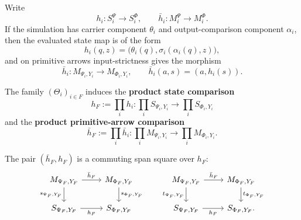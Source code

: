 Write
\[
    h_i:S_i^\Psi\to S_i^\Phi,
    \qquad
    \bar h_i:M_i^\Psi\to M_i^\Phi.
\]
If the simulation has carrier component \(\theta_i\) and output-comparison
component \(\alpha_i\), then the evaluated state map is of the form
\[
    h_i(q,z)=\bigl(\theta_i(q),\sigma_i(\alpha_i(q),z)\bigr),
\]
and on primitive arrows input-strictness gives the morphism
\[
    \bar h_i:
    M_{\Psi_i,Y_i}\to M_{\Phi_i,Y_i},
    \qquad
    \bar h_i(a,s)=(a,h_i(s)).
\]

\begin{definition}
\label{def:cmett-product-evaluated-simulation-comparison}
    The family \((\Theta_i)_{i\in F}\) induces the \textbf{product state
    comparison}
    \[
        h_F:=\prod_i h_i:
        \prod_iS_{\Psi_i,Y_i}
        \to
        \prod_iS_{\Phi_i,Y_i}
    \]
    and the \textbf{product primitive-arrow comparison}
    \[
        \bar h_F:=\prod_i\bar h_i:
        \prod_iM_{\Psi_i,Y_i}
        \to
        \prod_iM_{\Phi_i,Y_i}.
    \]
\end{definition}

\begin{proposition}
\label{prop:cmett-simulation-compatibility-monoidal-execution}
    The pair \((\bar h_F,h_F)\) is a commuting span square over \(h_F\):
    \[
\begin{tikzcd}
M_{\Psi_F,Y_F}
    \arrow[r,"\bar h_F"]
    \arrow[d,"s_{\Psi_F,Y_F}"']
&
M_{\Phi_F,Y_F}
    \arrow[d,"s_{\Phi_F,Y_F}"]
\\
S_{\Psi_F,Y_F}
    \arrow[r,"h_F"']
&
S_{\Phi_F,Y_F}
\end{tikzcd}
    \qquad
\begin{tikzcd}
M_{\Psi_F,Y_F}
    \arrow[r,"\bar h_F"]
    \arrow[d,"t_{\Psi_F,Y_F}"']
&
M_{\Phi_F,Y_F}
    \arrow[d,"t_{\Phi_F,Y_F}"]
\\
S_{\Psi_F,Y_F}
    \arrow[r,"h_F"']
&
S_{\Phi_F,Y_F}.
\end{tikzcd}
    \]
\end{proposition}


